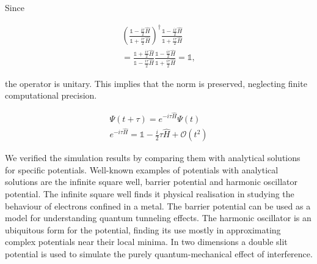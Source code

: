 Since

\begin{gather*}
\left(\frac{\mathbb{1}-\frac{i\tau}{2}\hat{H}}{\mathbb{1}+\frac{i\tau}{2}\hat{H}}\right)^{\dagger}\frac{\mathbb{1}-\frac{i\tau}{2}\hat{H}}{\mathbb{1}+\frac{i\tau}{2}\hat{H}}\\
= \frac{\mathbb{1}+\frac{i\tau}{2}\hat{H}}{\mathbb{1}-\frac{i\tau}{2}\hat{H}}\frac{\mathbb{1}-\frac{i\tau}{2}\hat{H}}{\mathbb{1}+\frac{i\tau}{2}\hat{H}} = \mathbb{1},
\end{gather*}

the operator is unitary. This implies that the norm is preserved, neglecting finite computational precision.


\begin{gather*}
\Psi(t+\tau) = e^{-i\tau\hat{H}}\Psi(t)\\
e^{-i\tau\hat{H}} = \mathbb{1}-\frac{i}{2}\tau\hat{H}+\mathcal{O}(t^2)
\end{gather*}

We verified the simulation results by comparing them with analytical solutions for specific potentials. Well-known examples of potentials with analytical solutions are the infinite square well, barrier potential and harmonic oscillator potential.
The infinite square well finds it physical realisation in studying the behaviour of electrons confined in a metal. The barrier potential can be used as a model for understanding quantum tunneling effects. The harmonic oscillator is an ubiquitous form for the potential, finding its use mostly in approximating complex potentials near their local minima.
In two dimensions a double slit potential is used to simulate the purely quantum-mechanical effect of interference.
